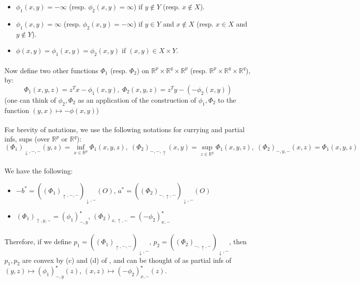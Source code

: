 \begin{itemize}
	\item $\phi_1(x,y)=-\infty$ (resp. $\phi_2(x,y)=\infty$) if $y\notin Y$ (resp. $x\notin X$).
	\item $\phi_1(x,y)=\infty$ (resp. $\phi_2(x,y)=-\infty$) if $y\in Y$ and $x\notin X$ (resp. $x\in X$ and $y\notin Y$).
	\item $\phi(x,y)=\phi_1(x,y)=\phi_2(x,y)$ if $(x,y)\in X\times Y$.
\end{itemize}

\paragraph{}Now define two other functions $\Phi_1$ (resp. $\Phi_2$) on $\mathbb{R}^p\times \mathbb{R}^q\times \mathbb{R}^p$ (resp. $\mathbb{R}^p\times \mathbb{R}^q\times \mathbb{R}^q$), by:
\[
	\Phi_1(x,y,z)=z^Tx-\phi_1(x,y),\;
	\Phi_2(x,y,z)=z^Ty-(-\phi_2(x,y))
\]
(one can think of $\phi_2,\Phi_2$ as an application of the construction of $\phi_1,\Phi_2$ to the function $(y,x)\mapsto -\phi (x,y)$)

\paragraph{}For brevity of notations, we use the following notations for currying and partial infs, sups (over $\mathbb{R}^{p}$ or $\mathbb{R}^q$):
\[
	(\Phi_1)_{\downarrow,-,-}(y,z)=\inf_{x\in \mathbb{R}^p}\Phi_1(x,y,z),\;
	(\Phi_2)_{-,-,\uparrow}(x,y)=\sup_{z\in \mathbb{R}^q}\Phi_1(x,y,z),\;
	(\Phi_2)_{-,y,-}(x,z)=\Phi_1(x,y,z)
\]

\paragraph{}We have the following:
\begin{itemize}
	\item $-b^\ast=((\Phi_{1})_{\uparrow,-,-})_{\downarrow,-}(O)$, $a^\ast=((\Phi_{2})_{-,\uparrow,-})_{\downarrow,-}(O)$
	\item $(\Phi_1)_{\uparrow,y,-}=(\phi_1)_{-,y}^\star$, $(\Phi_2)_{x,\uparrow,-}=(-\phi_2)_{x,-}^\star$
\end{itemize}

\paragraph{}Therefore, if we define $p_1=((\Phi_{1})_{\uparrow,-,-})_{\downarrow,-}$, $p_2=((\Phi_{2})_{-,\uparrow,-})_{\downarrow,-}$, then $p_1,p_2$ are convex by (c) and (d) of , and can be thought of as partial infs of $(y,z)\mapsto(\phi_{1})_{-,y}^\star(z)$, $(x,z)\mapsto(-\phi_{2})_{x,-}^\star(z)$.

